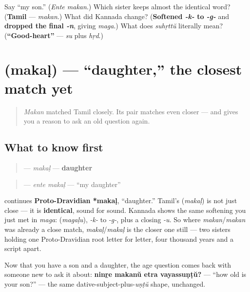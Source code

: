 \begin{tcolorbox}[breakable,colback=teal!4,colframe=teal!35!black,title={Before you move on}]
Say \textquotedblleft{}my son.\textquotedblright{} (\emph{Ente makan}.) Which sister keeps almost the identical word? (\textbf{Tamil} — \emph{makan}.) What did Kannada change? (\textbf{Softened \emph{-k-} to \emph{-g-}} and \textbf{dropped the final \emph{-n}}, giving \emph{maga}.) What does \emph{suhṛttŭ} literally mean? (\textbf{\textquotedblleft{}Good-heart\textquotedblright{}} — \emph{su} plus \emph{hṛd}.)
\end{tcolorbox}
\section[\texorpdfstring{\ml{മകൾ} (makaḷ)}{മകൾ (makaḷ)}]{ (makaḷ) — \textquotedblleft{}daughter,\textquotedblright{} the closest match yet}

\label{lesson:ML-C36-makal}



\begin{quote}
\emph{Makan} matched Tamil closely. Its pair matches even closer — and gives you a reason to ask an old question again.
\end{quote}

\subsection*{What to know first}
\begin{quote}
\textbf{} — \emph{makaḷ} — \textbf{daughter}
\end{quote}

\begin{quote}
\textbf{ } — \emph{ente makaḷ} — \textquotedblleft{}my daughter\textquotedblright{}
\end{quote}

\begin{cousinweb}
\textbf{} continues \textbf{Proto-Dravidian *makaḷ}, \textquotedblleft{}daughter.\textquotedblright{} Tamil's \textbf{} (\emph{makaḷ}) is not just close — it is \textbf{identical}, sound for sound. Kannada shows the same softening you just met in \emph{maga}: \textbf{} (\emph{magaḷu}), \emph{-k-} to \emph{-g-}, plus a closing \emph{-u}. So where \emph{makan}/\emph{makan} was already a close match, \emph{makaḷ}/\emph{makaḷ} is the closer one still — two sisters holding one Proto-Dravidian root letter for letter, four thousand years and a script apart.

Now that you have a son and a daughter, the age question comes back with someone new to ask it about: \textbf{ninṟe makanŭ etra vayassuṇṭŭ?} — \textquotedblleft{}how old is your son?\textquotedblright{} — the same dative-subject-plus-\emph{uṇṭŭ} shape, unchanged.
\end{cousinweb}

